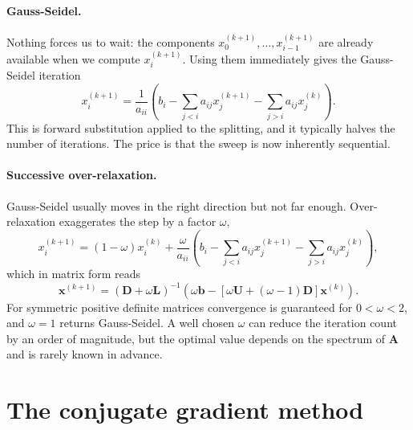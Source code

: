 \paragraph{Gauss-Seidel.}
Nothing forces us to wait: the components $x_0^{(k+1)},\dots,x_{i-1}^{(k+1)}$
are already available when we compute $x_i^{(k+1)}$.  Using them immediately
gives the Gauss-Seidel iteration
\begin{equation}
  x_i^{(k+1)} = \frac{1}{a_{ii}}
     \left(b_i - \sum_{j<i} a_{ij}x_j^{(k+1)}
                - \sum_{j>i} a_{ij}x_j^{(k)}\right).
  \label{eq:1-gaussseidel}
\end{equation}
This is forward substitution applied to the splitting, and it typically halves
the number of iterations.  The price is that the sweep is now inherently
sequential.

\paragraph{Successive over-relaxation.}
Gauss-Seidel usually moves in the right direction but not far enough.
Over-relaxation exaggerates the step by a factor $\omega$,
\begin{equation}
  x_i^{(k+1)} = (1-\omega)x_i^{(k)} + \frac{\omega}{a_{ii}}
     \left(b_i - \sum_{j<i} a_{ij}x_j^{(k+1)}
                - \sum_{j>i} a_{ij}x_j^{(k)}\right),
  \label{eq:1-sor}
\end{equation}
which in matrix form reads
\begin{equation}
  \bm{x}^{(k+1)} = (\bm{D}+\omega\bm{L})^{-1}
     \left(\omega\bm{b}
       -\left[\omega\bm{U}+(\omega-1)\bm{D}\right]\bm{x}^{(k)}\right).
  \label{eq:1-sormat}
\end{equation}
For symmetric positive definite matrices convergence is guaranteed for
$0<\omega<2$, and $\omega=1$ returns Gauss-Seidel.  A well chosen $\omega$ can
reduce the iteration count by an order of magnitude, but the optimal value
depends on the spectrum of $\bm{A}$ and is rarely known in advance.

\section{The conjugate gradient method}
\label{sec:cg}

